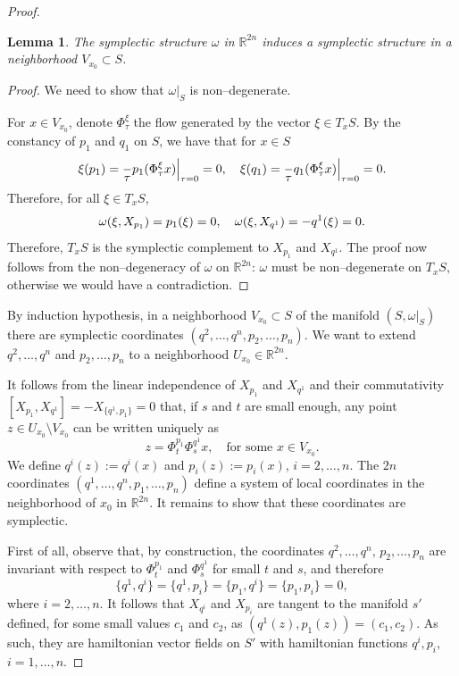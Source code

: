 \documentclass[english,fontsize=11pt,paper=a5,oneside]{scrbook}
\newcommand{\R}{\mathbb{R}}
\let\d\relax
\newcommand{\d}{\mathrm{d}}
\newtheorem{lemma}[theorem]{Lemma}
\theoremstyle{definition}
\begin{document}
\begin{proof}
  \begin{lemma}
    The symplectic structure $\omega$ in $\R^{2n}$ induces a symplectic structure in a neighborhood $V_{x_0}\subset S$.
  \end{lemma}
  \begin{proof}
    We need to show that $\omega|_S$ is non--degenerate.

    For $x\in V_{x_0}$, denote $\Phi_\tau^\xi$ the flow generated by the vector $\xi\in T_x S$.
    By the constancy of $p_1$ and $q_1$ on $S$, we have that for $x\in S$
    \begin{equation}
      \xi(p_1) = \frac{\d}{\d\tau} p_1(\Phi_\tau^\xi x)\Big|_{\tau=0} = 0, \quad
      \xi(q_1) = \frac{\d}{\d\tau} q_1(\Phi_\tau^\xi x)\Big|_{\tau=0} = 0.
    \end{equation}
    Therefore, for all $\xi \in T_x S$,
    \begin{equation}
      \omega(\xi, X_{p_1}) = \d p_1(\xi) = 0,\quad
      \omega(\xi, X_{q^1}) = -\d q^1(\xi) = 0.
    \end{equation}
    Therefore, $T_x S$ is the symplectic complement to $X_{p_1}$ and $X_{q^1}$.
    The proof now follows from the non--degeneracy of $\omega$ on $\R^{2n}$: $\omega$ must be non--degenerate on $T_x S$, otherwise we would have a contradiction.
  \end{proof}

  By induction hypothesis, in a neighborhood $V_{x_0}\subset S$ of the manifold $(S, \omega|_S)$ there are symplectic coordinates $(q^2, \ldots, q^n, p_2, \ldots, p_n)$. We want to extend $q^2, \ldots, q^n$ and $p_2, \ldots, p_n$ to a neighborhood $U_{x_0}\in\R^{2n}$.

  It follows from the linear independence of $X_{p_1}$ and $X_{q^1}$ and their commutativity $[X_{p_1}, X_{q^1}] = -X_{\big\{q^1,p_1\big\}} = 0$ that, if $s$ and $t$ are small enough, any point $z\in U_{x_0}\setminus V_{x_0}$ can be written uniquely as
  \begin{equation}
    z = \Phi_t^{p_1}\Phi_s^{q^1} x, \quad\mbox{for some }x\in V_{x_0}.
  \end{equation}
  We define $q^i(z) := q^i(x)$ and $p_i(z) := p_i(x)$, $i=2,\ldots,n$.
  The $2n$ coordinates $(q^1, \ldots, q^n, p_1, \ldots, p_n)$ define a system of local coordinates in the neighborhood of $x_0$ in $\R^{2n}$. It remains to show that these coordinates are symplectic.

  First of all, observe that, by construction, the coordinates $q^2, \ldots, q^n$, $p_2, \ldots, p_n$ are invariant with respect to $\Phi_t^{p_1}$ and $\Phi_s^{q^1}$ for small $t$ and $s$, and therefore
  \begin{equation}
    \big\{q^1, q^i\big\} = \big\{q^1, p_i\big\} = \big\{p_1, q^i\big\} = \big\{p_1, p_i\big\} = 0,
  \end{equation}
  where $i = 2,\ldots,n$.
  It follows that $X_{q^i}$ and $X_{p_i}$ are tangent to the manifold $s'$ defined, for some small values $c_1$ and $c_2$, as $(q^1(z), p_1(z)) = (c_1, c_2)$.
  As such, they are hamiltonian vector fields on $S'$ with hamiltonian functions $q^i, p_i$, $i=1,\ldots,n$.


\end{proof}
\end{document}
